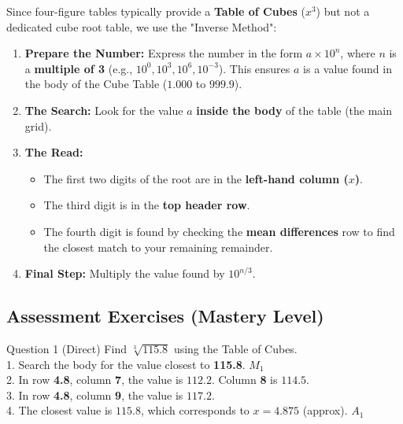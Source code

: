\documentclass[12pt, a4paper, oneside]{article}
\begin{document}
\begin{tcolorbox}[colback=lightgrey, colframe=primaryblue, title=\textbf{Methodology: The Inverse Look-up}, arc=5pt]
    Since four-figure tables typically provide a \textbf{Table of Cubes} ($x^3$) but not a dedicated cube root table, we use the "Inverse Method":
    \begin{enumerate}
        \item \textbf{Prepare the Number:} Express the number in the form $a \times 10^n$, where $n$ is a \textbf{multiple of 3} (e.g., $10^0, 10^3, 10^6, 10^{-3}$). This ensures $a$ is a value found in the body of the Cube Table ($1.000$ to $999.9$).
        \item \textbf{The Search:} Look for the value $a$ \textbf{inside the body} of the table (the main grid).
        \item \textbf{The Read:} 
            \begin{itemize}
                \item The first two digits of the root are in the \textbf{left-hand column ($x$)}.
                \item The third digit is in the \textbf{top header row}.
                \item The fourth digit is found by checking the \textbf{mean differences} row to find the closest match to your remaining remainder.
            \end{itemize}
        \item \textbf{Final Step:} Multiply the value found by $10^{n/3}$.
    \end{enumerate}
\end{tcolorbox}

\subsection*{Assessment Exercises (Mastery Level)}

\begin{solvingbox}{Question 1 (Direct)}
Find $\sqrt[3]{115.8}$ using the Table of Cubes. \\
1. Search the body for the value closest to \textbf{115.8}. \hfill $M_1$ \\
2. In row \textbf{4.8}, column \textbf{7}, the value is $112.2$. Column \textbf{8} is $114.5$. \\
3. In row \textbf{4.8}, column \textbf{9}, the value is $117.2$. \\
4. The closest value is $115.8$, which corresponds to $x = \mathbf{4.875}$ (approx). \hfill $A_1$
\end{solvingbox}
\end{document}
